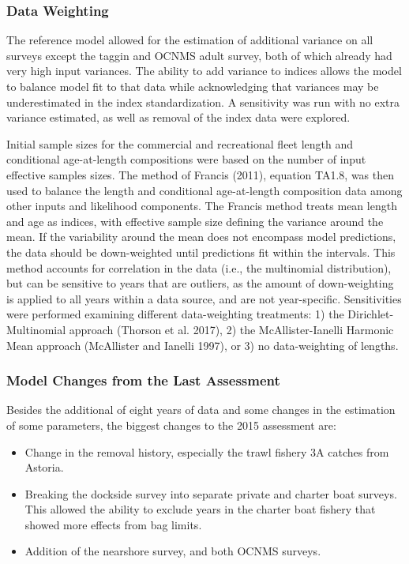 \documentclass[11pt,
  letterpaper,
]{article}
\providecommand{\tightlist}{%
  \setlength{\itemsep}{0pt}\setlength{\parskip}{0pt}}
\providecommand{\tightlist}{%
  \setlength{\itemsep}{0pt}\setlength{\parskip}{0pt}}
\begin{document}
\hypertarget{data-weighting}{%
\subsubsection{Data Weighting}\label{data-weighting}}

The reference model allowed for the estimation of additional variance on all surveys except the taggin and OCNMS adult survey, both of which already had very high input variances. The ability to add variance to indices allows the model to balance model fit to that data while acknowledging that variances may be underestimated in the index standardization. A sensitivity was run with no extra variance estimated, as well as removal of the index data were explored.

Initial sample sizes for the commercial and recreational fleet length and conditional age-at-length compositions were based on the number of input effective samples sizes. The method of Francis (2011), equation TA1.8, was then used to balance the length and conditional age-at-length composition data among other inputs and likelihood components. The Francis method treats mean length and age as indices, with effective sample size defining the variance around the mean. If the variability around the mean does not encompass model predictions, the data should be down-weighted until predictions fit within the intervals. This method accounts for correlation in the data (i.e., the multinomial distribution), but can be sensitive to years that are outliers, as the amount of down-weighting is applied to all years within a data source, and are not year-specific. Sensitivities were performed examining different data-weighting treatments: 1) the Dirichlet-Multinomial approach (Thorson et al. 2017), 2) the McAllister-Ianelli Harmonic Mean approach (McAllister and Ianelli 1997), or 3) no data-weighting of lengths.

\hypertarget{model-changes-from-the-last-assessment}{%
\subsubsection{Model Changes from the Last Assessment}\label{model-changes-from-the-last-assessment}}

Besides the additional of eight years of data and some changes in the estimation of some parameters, the biggest changes to the 2015 assessment are:

\begin{itemize}
\tightlist
\item
  Change in the removal history, especially the trawl fishery 3A catches from Astoria.
\item
  Breaking the dockside survey into separate private and charter boat surveys. This allowed the ability to exclude years in the charter boat fishery that showed more effects from bag limits.
\item
  Addition of the nearshore survey, and both OCNMS surveys.
\end{itemize}
\end{document}

